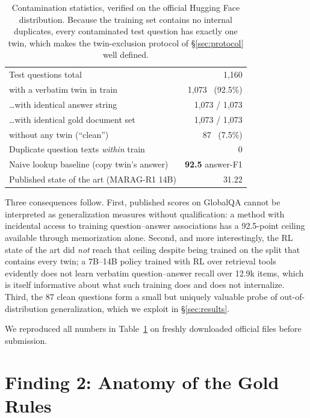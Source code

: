 \documentclass[11pt]{article}
\begin{document}
\begin{table}[h]
\centering
\begin{tabular}{lr}
\toprule
Test questions total & 1{,}160\\
\quad with a verbatim twin in train & 1{,}073 \ (92.5\%)\\
\qquad \ldots{}with identical answer string & 1{,}073 / 1{,}073\\
\qquad \ldots{}with identical gold document set & 1{,}073 / 1{,}073\\
\quad without any twin (``clean'') & 87 \ (7.5\%)\\
Duplicate question texts \emph{within} train & 0\\
\midrule
Naive lookup baseline (copy twin's answer) & \textbf{92.5} answer-F1\\
Published state of the art (MARAG-R1 14B) & 31.22\\
\bottomrule
\end{tabular}
\caption{Contamination statistics, verified on the official Hugging Face distribution. Because the training set contains no internal duplicates, every contaminated test question has exactly one twin, which makes the twin-exclusion protocol of \S\ref{sec:protocol} well defined.}
\label{tab:contamination}
\end{table}

Three consequences follow. First, published scores on GlobalQA cannot be interpreted as generalization measures without qualification: a method with incidental access to training question--answer associations has a 92.5-point ceiling available through memorization alone. Second, and more interestingly, the RL state of the art did \emph{not} reach that ceiling despite being trained on the split that contains every twin; a 7B--14B policy trained with RL over retrieval tools evidently does not learn verbatim question--answer recall over 12.9k items, which is itself informative about what such training does and does not internalize. Third, the 87 clean questions form a small but uniquely valuable probe of out-of-distribution generalization, which we exploit in \S\ref{sec:results}.

We reproduced all numbers in Table~\ref{tab:contamination} on freshly downloaded official files before submission.

\section{Finding 2: Anatomy of the Gold Rules}
\label{sec:goldrules}
\end{document}

